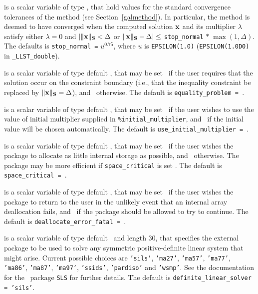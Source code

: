 \documentclass{galahad}
\newcommand{\packagename}{LLST}
\newcommand{\fullpackagename}{\libraryname\_\packagename}
\begin{document}
\begin{description}
 is a scalar variable of type \realdp, 
that hold values for the standard convergence tolerances of the method
(see Section~\ref{galmethod}). 
In particular, the method is deemed to have converged when the
computed solution ${\mathbf{x}}$ and its multiplier $\lambda$ satisfy either
$\lambda = 0$ and $|\|{\mathbf{x}}\|_{{\mathbf{S}}} < \Delta$ or
$\|{\mathbf{x}}\|_{{\mathbf{S}}} -  \Delta| \leq$ {\tt stop\_normal} $\ast \; 
\max(1,\Delta)$.
The defaults is {\tt stop\_normal =} $u^{0.75}$,
where $u$ is {\tt EPSILON(1.0)} ({\tt EPSILON(1.0D0)} in 
{\tt \fullpackagename\_double}).

 is a scalar variable of type default \logical, that
may be set \true\ if the user requires that the solution 
occur on the constraint boundary (i.e., that the inequality constraint be
replaced by $\|{\mathbf{x}}\|_{{\mathbf{S}}} = \Delta$), and \false\ otherwise. 
The default is {\tt equality\_problem = \false}.
 
 is a scalar variable of type default \logical, 
that may be set \true\ if the user wishes to use the value of initial 
multiplier supplied in {\tt \%initial\_multiplier}, 
and \false\ if the initial value will be chosen automatically.
The default is {\tt use\_initial\_multiplier = \false}.
 
 is a scalar variable of type default \logical, that
may be set \true\ if the user wishes the package to allocate as little
internal storage as possible, and \false\ otherwise. The package may
be more efficient if {\tt space\_critical} is set \false.
The default is {\tt space\_critical = \false}.

 is a scalar variable of type default \logical, 
that may be set \true\ if the user wishes the package to return to the user 
in the unlikely event that an internal array deallocation fails, 
and \false\ if the package should be allowed to try to continue.
The default is {\tt deallocate\_error\_fatal = \false}.

 is a scalar variable of type default \character\
and length 30, that specifies the external package to be used to
solve any symmetric positive-definite linear system that might arise. 
Current possible
choices are {\tt 'sils'}, {\tt 'ma27'}, {\tt 'ma57'}, {\tt 'ma77'},
{\tt 'ma86'}, {\tt 'ma87'}, {\tt 'ma97'}, {\tt 'ssids'}, {\tt 'pardiso'}
and {\tt 'wsmp'}. 
See the documentation for the \galahad\ package {\tt SLS} for further details. 
The default is {\tt definite\_linear\_solver = 'sils'}.


\end{description}
\end{document}
